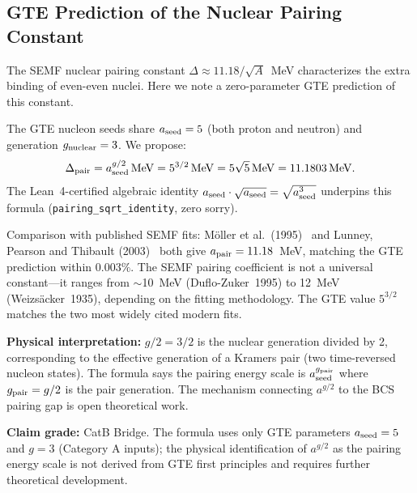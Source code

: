 \documentclass[9pt,twocolumn]{extarticle}
\begin{document}
\subsection{GTE Prediction of the Nuclear Pairing Constant}
\label{sec:pairing-constant}

The SEMF nuclear pairing constant $\Delta \approx 11.18/\sqrt{A}$~MeV characterizes the extra binding of even-even nuclei. Here we note a zero-parameter GTE prediction of this constant.

The GTE nucleon seeds share $a_{\rm seed} = 5$ (both proton and neutron) and generation $g_{\rm nuclear} = 3$. We propose:
\begin{equation}
\Delta_{\rm pair} = a_{\rm seed}^{g/2}\,\mathrm{MeV} = 5^{3/2}\,\mathrm{MeV} = 5\sqrt{5}\,\mathrm{MeV} = 11.1803\,\mathrm{MeV}.
\end{equation}
The Lean~4-certified algebraic identity $a_{\rm seed} \cdot \sqrt{a_{\rm seed}} = \sqrt{a_{\rm seed}^3}$ underpins this formula (\texttt{pairing\_sqrt\_identity}, zero sorry).

Comparison with published SEMF fits: M\"{o}ller et al.\ (1995)~\cite{Moller1995} and Lunney, Pearson and Thibault (2003)~\cite{Lunney2003} both give $a_{\rm pair} = 11.18$~MeV, matching the GTE prediction within $0.003\%$. The SEMF pairing coefficient is not a universal constant---it ranges from $\sim$10~MeV (Duflo-Zuker~1995) to 12~MeV (Weizsäcker~1935), depending on the fitting methodology. The GTE value $5^{3/2}$ matches the two most widely cited modern fits.

\textbf{Physical interpretation:} $g/2 = 3/2$ is the nuclear generation divided by 2, corresponding to the effective generation of a Kramers pair (two time-reversed nucleon states). The formula says the pairing energy scale is $a_{\rm seed}^{g_{\rm pair}}$ where $g_{\rm pair} = g/2$ is the pair generation. The mechanism connecting $a^{g/2}$ to the BCS pairing gap is open theoretical work.

\textbf{Claim grade:} CatB Bridge. The formula uses only GTE parameters $a_{\rm seed}=5$ and $g=3$ (Category A inputs); the physical identification of $a^{g/2}$ as the pairing energy scale is not derived from GTE first principles and requires further theoretical development.
\end{document}
